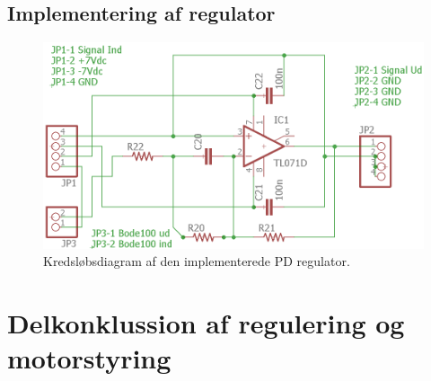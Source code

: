 \subsection{Implementering af regulator}
\begin{figure}[h!]
\centering
\includegraphics[width=.8\textwidth]{billeder/pd_schematic.png}
\caption{Kredsløbsdiagram af den implementerede PD regulator.}
\label{fig:pd_schematic}
\end{figure}
\FloatBlock 



\section{Delkonklussion af regulering og motorstyring}











